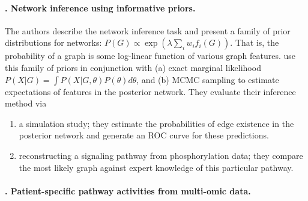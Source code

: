 \documentclass[14pt]{article}
\begin{document}
\paragraph{ \citet{2008-mukherjee-priors}. Network inference using informative priors.}
The authors describe the network inference task and present a family of prior distributions for networks:
$ P(G) \propto \exp\left( \lambda \sum_i w_i f_i(G) \right).$ 
That is, the probability of a graph is some log-linear function of various graph features. 
\citeauthor{2008-mukherjee-priors} use this family of priors in conjunction with 
(a) exact marginal likelihood $P(X | G) = \int P(X | G, \theta) P(\theta) d\theta$, and
(b) MCMC sampling
to estimate expectations of features in the posterior network.
They evaluate their inference method via 
\begin{enumerate}
    \item a simulation study; they estimate the probabilities of edge existence in the posterior network
        and generate an ROC curve for these predictions.
    \item reconstructing a signaling pathway from phosphorylation data; they compare the most likely
        graph against expert knowledge of this particular pathway.
\end{enumerate}

\paragraph{ \citet{2010-vaske-paradigm}. Patient-specific pathway activities from multi-omic data.}




\pagebreak
\end{document}
